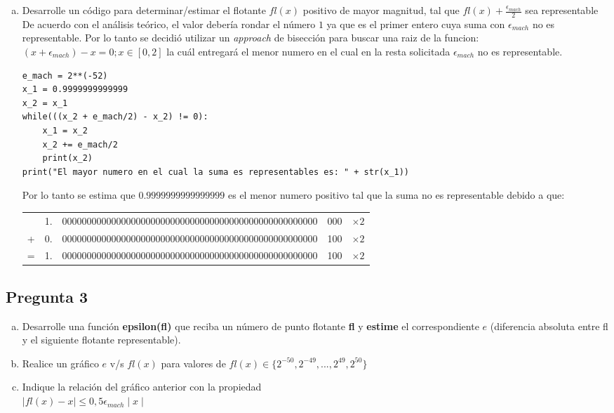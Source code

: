 \documentclass[10pt]{article}
\begin{document}
\begin{enumerate}[a)]
\item Desarrolle un código para determinar/estimar el flotante $fl(x)$ positivo de mayor magnitud, tal que $fl(x) + \frac{\epsilon_{mach}}{2}$ sea representable\\
De acuerdo con el análisis teórico, el valor debería rondar el número $1$ ya que es el primer entero cuya suma con $\epsilon_{mach}$ no es representable. Por lo tanto se decidió utilizar un \textit{approach} de bisección para buscar una raiz de la funcion: $(x + \epsilon_{mach}) - x = 0 ; x \in [0, 2]$ la cuál entregará el menor numero en el cual en la resta solicitada $\epsilon_{mach}$ no es representable.
\begin{verbatim}
e_mach = 2**(-52)
x_1 = 0.9999999999999
x_2 = x_1
while(((x_2 + e_mach/2) - x_2) != 0):
	x_1 = x_2
	x_2 += e_mach/2
	print(x_2)
print("El mayor numero en el cual la suma es representables es: " + str(x_1))
\end{verbatim}
Por lo tanto se estima que $0.9999999999999999$ es el menor numero positivo tal que la suma no es representable debido a que:
\begin{center}
\begin{tabular}{c c | c | c | c}
 \cline{3-4}
 & 1. & 0000000000000000000000000000000000000000000000000000 & 000 & $\times 2$\\
 \cline{3-4}
 + & 0. & 0000000000000000000000000000000000000000000000000000 & 100 & $\times 2$\\
 \cline{1-5}
 = & 1. & 0000000000000000000000000000000000000000000000000000 & 100 & $\times 2$\\
 \cline{3-4}
\end{tabular}
\end{center}


\end{enumerate}

\subsection{Pregunta 3}
\begin{enumerate}[a)]
\item Desarrolle una función \textbf{epsilon(fl)} que reciba un número de punto flotante \textbf{fl} y \textbf{estime} el correspondiente $e$ (diferencia absoluta entre fl y el siguiente flotante representable).

\item Realice un gráfico $e$ v/s $fl(x)$ para valores de $fl(x) \in \{2^{-50}, 2^{-49}, ..., 2^{49}, 2^{50}\}$

\item Indique la relación del gráfico anterior con la propiedad \\
$\mid fl(x)-x \mid \leq 0,5 \epsilon_{mach} \mid x \mid$
\end{enumerate}
\end{document}
